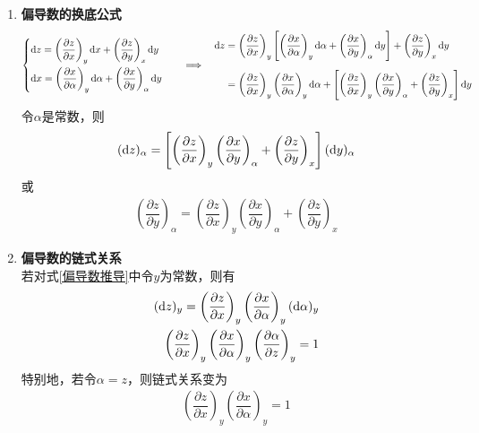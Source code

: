 \begin{enumerate}
\item \textbf{偏导数的换底公式}
\begin{align}
	\begin{cases}
		{\rm{d}} z = \left(\dfrac{\partial z}{\partial x}\right)_y {\rm{d}} x + \left(\dfrac{\partial z}{\partial y}\right)_x {\rm{d}} y\\[1em]
		{\rm{d}} x = \left(\dfrac{\partial x}{\partial \alpha}\right)_y {\rm{d}} \alpha + \left(\dfrac{\partial x}{\partial y}\right)_\alpha {\rm{d}} y
	\end{cases}
\quad \Longrightarrow \quad 
\begin{aligned}
	{\rm{d}} z &=\left(\dfrac{\partial z}{\partial x}\right)_y \left[\left(\dfrac{\partial x}{\partial \alpha}\right)_y {\rm{d}} \alpha + \left(\dfrac{\partial x}{\partial y}\right)_\alpha {\rm{d}} y\right] + \left(\dfrac{\partial z}{\partial y}\right)_x {\rm{d}} y \\[0.5em]
	& = \left(\dfrac{\partial z}{\partial x}\right)_y\left(\dfrac{\partial x}{\partial \alpha}\right)_y {\rm{d}} \alpha  + \left[\left(\dfrac{\partial z}{\partial x}\right)_y \left(\dfrac{\partial x}{\partial y}\right)_\alpha + \left(\dfrac{\partial z}{\partial y}\right)_x  \right]{\rm{d}} y
\end{aligned}
\label{偏导数推导}
\end{align}
令$\alpha $是常数，则
\begin{align}
	({\rm{d}} z)_\alpha = \left[\left(\dfrac{\partial z}{\partial x}\right)_y \left(\dfrac{\partial x}{\partial y}\right)_\alpha + \left(\dfrac{\partial z}{\partial y}\right)_x  \right]({\rm{d}} y)_\alpha
\end{align}
或
\begin{align}
	\left(\dfrac{\partial z}{\partial y}\right)_\alpha = \left(\dfrac{\partial z}{\partial x}\right)_y \left(\dfrac{\partial x}{\partial y}\right)_\alpha + \left(\dfrac{\partial z}{\partial y}\right)_x 
\end{align}

\item \textbf{偏导数的链式关系}\\
若对式\eqref{偏导数推导}中令$y$为常数，则有
\begin{align}
	({\rm{d}} z)_y = \left(\dfrac{\partial z}{\partial x}\right)_y\left(\dfrac{\partial x}{\partial \alpha}\right)_y ({\rm{d}} \alpha)_y  \notag\\
	\left(\dfrac{\partial z}{\partial x}\right)_y\left(\dfrac{\partial x}{\partial \alpha}\right)_y \left(\dfrac{\partial \alpha}{\partial z}\right)_y = 1
\end{align}
特别地，若令$\alpha = z$，则链式关系变为
\begin{align}
	\left(\dfrac{\partial z}{\partial x}\right)_y\left(\dfrac{\partial x}{\partial \alpha}\right)_y = 1
\end{align}

\end{enumerate}


